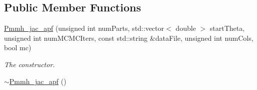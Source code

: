 \subsection*{Public Member Functions}
\begin{DoxyCompactItemize}
\item 
\hyperlink{classPmmh__jac__apf_a10d1ff1b6f508a1b9a9492e6bf8a563b}{Pmmh\+\_\+jac\+\_\+apf} (unsigned int num\+Parts, std\+::vector$<$ double $>$ start\+Theta, unsigned int num\+M\+C\+M\+C\+Iters, const std\+::string \&data\+File, unsigned int num\+Cols, bool mc)
\begin{DoxyCompactList}\small\item\em The constructor. \end{DoxyCompactList}\item 
\hyperlink{classPmmh__jac__apf_afbe2594fe7e40914ac4edc36580ebc33}{$\sim$\+Pmmh\+\_\+jac\+\_\+apf} ()\hypertarget{classPmmh__jac__apf_afbe2594fe7e40914ac4edc36580ebc33}{}\label{classPmmh__jac__apf_afbe2594fe7e40914ac4edc36580ebc33}


\end{DoxyCompactItemize}
